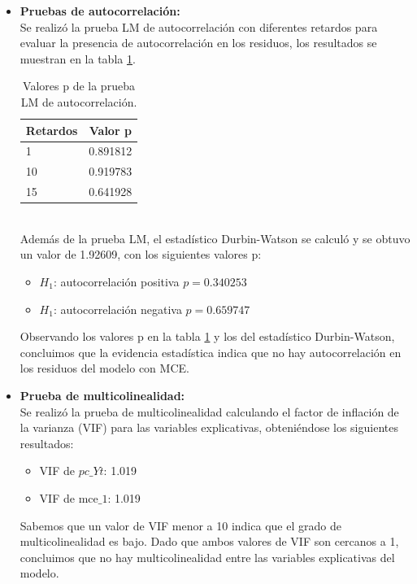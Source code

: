 \documentclass[12pt]{article}
\begin{document}
\begin{itemize}
    \item \textbf{Pruebas de autocorrelación:}\\
    Se realizó la prueba LM de autocorrelación con diferentes retardos para evaluar la presencia de autocorrelación en los residuos,
    los resultados se muestran en la tabla \ref{tab:LM_autocorr}.
    \begin{table}[h!]
    \centering
    \begin{tabular}{lc}
        \toprule
        Retardos & Valor p \\
        \midrule
        1 & 0.891812 \\
        10 & 0.919783 \\
        15 & 0.641928 \\
        \bottomrule
    \end{tabular}
    \caption{Valores p de la prueba LM de autocorrelación.}
    \label{tab:LM_autocorr}
    \end{table}\\
    Además de la prueba LM, el estadístico Durbin-Watson se calculó y se obtuvo un valor de 1.92609, con
    los siguientes valores p:
    \begin{itemize}
        \item $H_1$: autocorrelación positiva $p=0.340253$
        \item $H_1$: autocorrelación negativa $p=0.659747$
    \end{itemize}
    Observando los valores p en la tabla \ref{tab:LM_autocorr} y los del estadístico Durbin-Watson, concluimos 
    que la evidencia estadística indica que no hay autocorrelación en los residuos del modelo con MCE.

    \item \textbf{Prueba de multicolinealidad:}\\
    Se realizó la prueba de multicolinealidad calculando el factor de inflación de la varianza (VIF) para las variables explicativas,
    obteniéndose los siguientes resultados:
    \begin{itemize}
        \item VIF de $pc\_Yt$: 1.019
        \item VIF de $\text{mce}\_1$: 1.019
    \end{itemize}
    Sabemos que un valor de VIF menor a 10 indica que el grado de multicolinealidad es bajo. Dado que ambos valores de VIF son cercanos a 1,
    concluimos que no hay multicolinealidad entre las variables explicativas del modelo.



\end{itemize}
\end{document}
